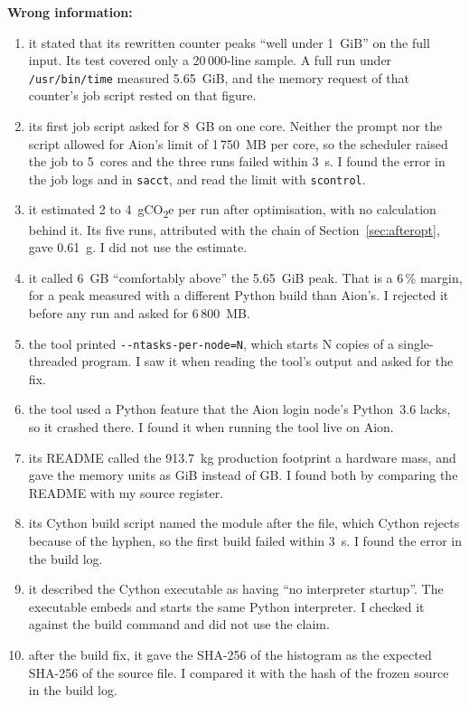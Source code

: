 \documentclass[conference,a4paper]{IEEEtran}
\begin{document}
\textbf{Wrong information:}
\begin{enumerate}
\item it stated that its rewritten counter peaks ``well under 1~GiB'' on the
  full input. Its test covered only a 20\,000-line sample. A full run under
  \texttt{/usr/bin/time} measured 5.65~GiB, and the memory request of that
  counter's job script rested on that figure.
\item its first job script asked for 8~GB on one core. Neither the prompt nor
  the script allowed for Aion's limit of 1\,750~MB per core, so the scheduler
  raised the job to 5~cores and the three runs failed within 3~s. I found the
  error in the job logs and in \texttt{sacct}, and read the limit with
  \texttt{scontrol}.
\item it estimated 2 to 4~gCO\textsubscript{2}e per run after optimisation,
  with no calculation behind it. Its five runs, attributed with the chain of
  Section~\ref{sec:afteropt}, gave 0.61~g. I did not use the estimate.
\item it called 6~GB ``comfortably above'' the 5.65~GiB peak. That is a 6\,\%
  margin, for a peak measured with a different Python build than Aion's. I
  rejected it before any run and asked for 6\,800~MB.
\item the tool printed \texttt{-{}-ntasks-per-node=N}, which starts N copies of
  a single-threaded program. I saw it when reading the tool's output and asked
  for the fix.
\item the tool used a Python feature that the Aion login node's Python~3.6
  lacks, so it crashed there. I found it when running the tool live on Aion.
\item its README called the 913.7~kg production footprint a hardware mass, and
  gave the memory units as GiB instead of GB. I found both by comparing the
  README with my source register.
\item its Cython build script named the module after the file, which Cython
  rejects because of the hyphen, so the first build failed within 3~s. I found
  the error in the build log.
\item it described the Cython executable as having ``no interpreter
  startup''. The executable embeds and starts the same Python interpreter. I
  checked it against the build command and did not use the claim.
\item after the build fix, it gave the SHA-256 of the histogram as the
  expected SHA-256 of the source file. I compared it with the hash of the frozen
  source in the build log.
\end{enumerate}
\end{document}
